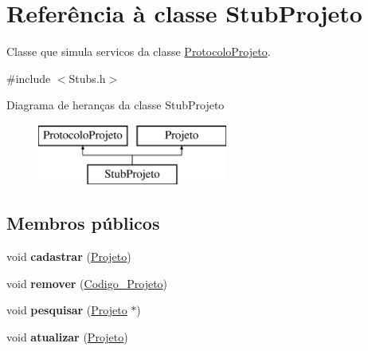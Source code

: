 \hypertarget{class_stub_projeto}{
\section{\-Referência à classe \-Stub\-Projeto}
\label{class_stub_projeto}
}


\-Classe que simula servicos da classe \hyperlink{class_protocolo_projeto}{\-Protocolo\-Projeto}.  




{\ttfamily \#include $<$\-Stubs.\-h$>$}

\-Diagrama de heranças da classe \-Stub\-Projeto\begin{figure}[H]
\begin{center}
\leavevmode
\includegraphics[height=2.000000cm]{class_stub_projeto}
\end{center}
\end{figure}
\subsection*{\-Membros públicos}
\begin{DoxyCompactItemize}
\item 
\hypertarget{class_stub_projeto_aeaf8872b472ce840a202f28a85b3e3df}{
void {\bfseries cadastrar} (\hyperlink{class_projeto}{\-Projeto})}
\label{class_stub_projeto_aeaf8872b472ce840a202f28a85b3e3df}

\item 
\hypertarget{class_stub_projeto_aad62ccaefc75730981af138f3402b78c}{
void {\bfseries remover} (\hyperlink{class_codigo___projeto}{\-Codigo\-\_\-\-Projeto})}
\label{class_stub_projeto_aad62ccaefc75730981af138f3402b78c}

\item 
\hypertarget{class_stub_projeto_a205f75c241e3c49ea66f3930cb5c458e}{
void {\bfseries pesquisar} (\hyperlink{class_projeto}{\-Projeto} $\ast$)}
\label{class_stub_projeto_a205f75c241e3c49ea66f3930cb5c458e}

\item 
\hypertarget{class_stub_projeto_a4bf3a817d152ab3461eda3a48defbf56}{
void {\bfseries atualizar} (\hyperlink{class_projeto}{\-Projeto})}
\label{class_stub_projeto_a4bf3a817d152ab3461eda3a48defbf56}

\end{DoxyCompactItemize}
